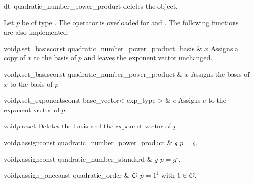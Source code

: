 \begin{fcode}{dt}{~quadratic_number_power_product}{}
  deletes the object.
\end{fcode}



\ASGN

Let $p$ be of type .  The operator \code{=} is overloaded
for  and .  The following
functions are also implemented:

\begin{fcode}{void}{$p$.set_basis}{const quadratic_number_power_product_basis & $x$}
  Assigns a copy of $x$ to the basis of $p$ and leaves the exponent vector unchanged.
\end{fcode}

\begin{fcode}{void}{$p$.set_basis}{const quadratic_number_power_product & $x$}
  Assigns the basis of $x$ to the basis of $p$.
\end{fcode}

\begin{fcode}{void}{$p$.set_exponents}{const base_vector< exp_type > & $e$}
  Assigns $e$ to the exponent vector of $p$.
\end{fcode}

\begin{fcode}{void}{$p$.reset}{}
  Deletes the basis and the exponent vector of $p$.
\end{fcode}

\begin{fcode}{void}{$p$.assign}{const quadratic_number_power_product & $q$}
  $p = q$.
\end{fcode}

\begin{fcode}{void}{$p$.assign}{const quadratic_number_standard & $g$}
  $p = g^1$.
\end{fcode}

\begin{fcode}{void}{$p$.assign_one}{const quadratic_order & $\mathcal{O}$}
  $p = 1^1$ with $1 \in \mathcal{O}$.
\end{fcode}

